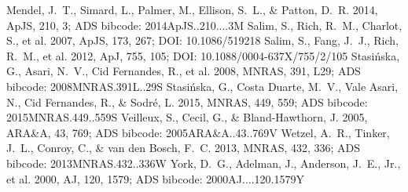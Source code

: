 \documentclass[twocolumn]{aastex631}
\begin{document}
\begin{thebibliography}{}
 Mendel, J.~T., Simard, L., Palmer, M., Ellison, S.~L., \& Patton, D.~R. 2014, ApJS, 210, 3; ADS bibcode: 2014ApJS..210....3M
 Salim, S., Rich, R.~M., Charlot, S., et al. 2007, ApJS, 173, 267; DOI: 10.1086/519218
 Salim, S., Fang, J.~J., Rich, R.~M., et al. 2012, ApJ, 755, 105; DOI: 10.1088/0004-637X/755/2/105
 Stasi{\'n}ska, G., Asari, N.~V., Cid Fernandes, R., et al. 2008, MNRAS, 391, L29; ADS bibcode: 2008MNRAS.391L..29S
 Stasi{\'n}ska, G., Costa Duarte, M.~V., Vale Asari, N., Cid Fernandes, R., \& Sodr{\'e}, L. 2015, MNRAS, 449, 559; ADS bibcode: 2015MNRAS.449..559S
 Veilleux, S., Cecil, G., \& Bland-Hawthorn, J. 2005, ARA\&A, 43, 769; ADS bibcode: 2005ARA\&A..43..769V
 Wetzel, A.~R., Tinker, J.~L., Conroy, C., \& van den Bosch, F.~C. 2013, MNRAS, 432, 336; ADS bibcode: 2013MNRAS.432..336W
 York, D.~G., Adelman, J., Anderson, J.~E., Jr., et al. 2000, AJ, 120, 1579; ADS bibcode: 2000AJ....120.1579Y
\end{thebibliography}
\end{document}
